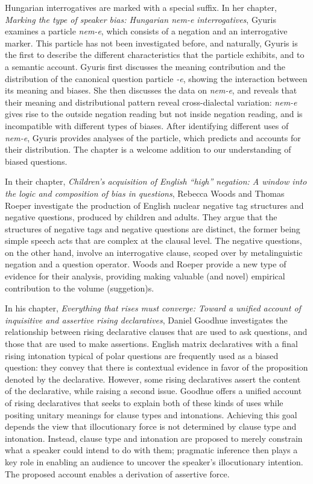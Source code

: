 \documentclass[output=paper,colorlinks,citecolor=brown]{langscibook}
\begin{document}
Hungarian interrogatives are marked with a special suffix. In her chapter, \textit{Marking the type of speaker bias: Hungarian \textit{nem-e} interrogatives}, Gyuris examines a particle \textit{nem-e}, which consists of a negation and an interrogative marker. This particle has not been investigated before, and naturally, Gyuris is the first to describe the different characteristics that the particle exhibits, and to a semantic account.  Gyuris first discusses the meaning contribution and the distribution of the canonical question particle \textit{-e}, showing the interaction between its meaning and biases. She then discusses the data on \textit{nem-e}, and reveals that their meaning and distributional pattern reveal cross-dialectal variation: \textit{nem-e} gives rise to the outside negation reading but not inside negation reading, and is incompatible with different types of biases.
After identifying different uses of \textit{nem-e}, Gyuris provides analyses of the particle, which predicts and accounts for their distribution. The chapter is a welcome addition to our understanding of biased questions.


In their chapter, \textit{Children's acquisition of English ``high'' negation: A window into the logic and composition of bias in questions}, Rebecca Woods and Thomas Roeper investigate the production of English nuclear negative tag structures and negative questions, produced by children and adults. They argue that the structures of negative tags and negative questions are distinct, the former being simple speech acts that are complex at the clausal level. The negative questions, on the other hand, involve an interrogative clause, scoped over by metalinguistic negation and a question operator. Woods and Roeper provide a new type of evidence for their analysis, providing making valuable (and novel) empirical contribution to the volume (suggetion)s.

In his chapter, \textit{Everything that rises must converge: Toward a unified account of inquisitive and assertive rising declaratives}, Daniel Goodhue investigates the relationship between rising declarative clauses that are used to ask questions, and those that are used to make assertions. English matrix declaratives with a final rising intonation typical of polar questions are frequently used as a biased question: they convey that there is contextual evidence in favor of the proposition denoted by the declarative. However, some rising declaratives assert the content of the declarative, while raising a second issue. Goodhue offers a unified account of rising declaratives that seeks to explain both of these kinds of uses while positing unitary meanings for clause types and intonations. Achieving this goal depends the view that illocutionary force is not determined by clause type and intonation. Instead, clause type and intonation are proposed to merely constrain what a speaker could intend to do with them; pragmatic inference then plays a key role in enabling an audience to uncover the speaker's illocutionary intention. The proposed account enables a derivation of assertive force. 

\printbibliography[heading=subbibliography,notkeyword=this]
\end{document}
